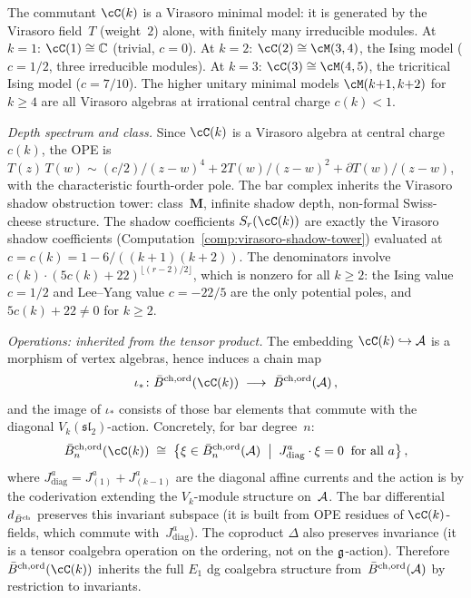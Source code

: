 \begin{computation}%
\label{comp:gko-coset-ordered-bar}%
%
%
%
%
The commutant $\cC(k)$ is a Virasoro minimal model:
it is generated by the Virasoro field~$T$ (weight~$2$)
alone, with finitely many irreducible modules.
At $k = 1$: $\cC(1) \cong \C$ (trivial, $c = 0$).
At $k = 2$: $\cC(2) \cong \cM(3,4)$, the Ising model
($c = 1/2$, three irreducible modules).
At $k = 3$: $\cC(3) \cong \cM(4,5)$, the tricritical
Ising model ($c = 7/10$). The higher unitary minimal
models $\cM(k{+}1, k{+}2)$ for $k \ge 4$ are all
Virasoro algebras at irrational central charge
$c(k) < 1$.

\smallskip
\noindent
\emph{Depth spectrum and class.}
Since $\cC(k)$ is a Virasoro algebra at central charge
$c(k)$, the OPE is
$T(z)\,T(w) \sim (c/2)/(z-w)^4
+ 2T(w)/(z-w)^2 + \partial T(w)/(z-w)$,
with the characteristic fourth-order pole.
The bar complex inherits the Virasoro shadow obstruction tower:
class~$\mathbf{M}$, infinite shadow depth,
non-formal Swiss-cheese structure.
The shadow coefficients $S_r(\cC(k))$ are exactly the
Virasoro shadow coefficients
(Computation~\ref{comp:virasoro-shadow-tower})
evaluated at $c = c(k) = 1 - 6/((k{+}1)(k{+}2))$.
The denominators involve $c(k) \cdot (5c(k) + 22)^{\lfloor(r-2)/2\rfloor}$,
which is nonzero for all $k \ge 2$: the
Ising value $c = 1/2$ and Lee--Yang value $c = -22/5$
are the only potential poles, and $5c(k) + 22 \ne 0$
for $k \ge 2$.

\smallskip
\noindent
\emph{Operations: inherited from the tensor product.}
The embedding $\cC(k) \hookrightarrow \cA$ is a
morphism of vertex algebras, hence induces a chain map
\begin{equation}\label{eq:gko-bar-inclusion}
\iota_*\colon
\bar{B}^{\mathrm{ch,ord}}(\cC(k))
\;\longrightarrow\;
\bar{B}^{\mathrm{ch,ord}}(\cA)\,,
\end{equation}
and the image of $\iota_*$ consists of those bar elements
that commute with the diagonal $V_k(\mathfrak{sl}_2)$-action.
Concretely, for bar degree~$n$:
\begin{equation}\label{eq:gko-bar-invariant}
\bar{B}^{\mathrm{ch,ord}}_n(\cC(k))
\;\cong\;
\bigl\{
\xi \in \bar{B}^{\mathrm{ch,ord}}_n(\cA)
\;\bigm|\;
J^a_{\mathrm{diag}} \cdot \xi = 0\;\;
\text{for all $a$}
\bigr\}\,,
\end{equation}
where $J^a_{\mathrm{diag}} = J^a_{(1)} + J^a_{(k-1)}$ are
the diagonal affine currents and the action is by the
coderivation extending the $V_k$-module structure on~$\mathcal{A}$.
The bar differential $d_{\bar{B}^{\mathrm{ch}}}$ preserves this invariant
subspace (it is built from OPE residues of $\cC(k)$-fields,
which commute with~$J^a_{\mathrm{diag}}$). The coproduct
$\Delta$ also preserves invariance (it is a tensor
coalgebra operation on the ordering, not on the $\mathfrak{g}$-action).
Therefore $\bar{B}^{\mathrm{ch,ord}}(\cC(k))$ inherits the full
$E_1$ dg coalgebra structure from~$\bar{B}^{\mathrm{ch,ord}}(\mathcal{A})$ by restriction to
invariants.


\end{computation}
